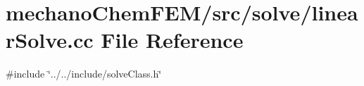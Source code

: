 \section{mechano\+Chem\+F\+E\+M/src/solve/linear\+Solve.cc File Reference}
\label{linear_solve_8cc}
{\ttfamily \#include \char`\"{}../../include/solve\+Class.\+h\char`\"{}}\newline
